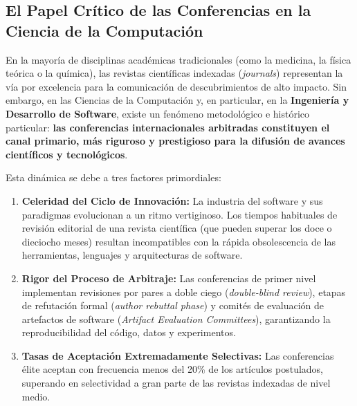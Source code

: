 \documentclass[12pt,a4paper]{article}
\begin{document}
\subsection{El Papel Crítico de las Conferencias en la Ciencia de la Computación}
En la mayoría de disciplinas académicas tradicionales (como la medicina, la física teórica o la química), las revistas científicas indexadas (\textit{journals}) representan la vía por excelencia para la comunicación de descubrimientos de alto impacto. Sin embargo, en las Ciencias de la Computación y, en particular, en la \textbf{Ingeniería y Desarrollo de Software}, existe un fenómeno metodológico e histórico particular: \textbf{las conferencias internacionales arbitradas constituyen el canal primario, más riguroso y prestigioso para la difusión de avances científicos y tecnológicos}.

Esta dinámica se debe a tres factores primordiales:
\begin{enumerate}[leftmargin=*]
    \item \textbf{Celeridad del Ciclo de Innovación:} La industria del software y sus paradigmas evolucionan a un ritmo vertiginoso. Los tiempos habituales de revisión editorial de una revista científica (que pueden superar los doce o dieciocho meses) resultan incompatibles con la rápida obsolescencia de las herramientas, lenguajes y arquitecturas de software.
    \item \textbf{Rigor del Proceso de Arbitraje:} Las conferencias de primer nivel implementan revisiones por pares a doble ciego (\textit{double-blind review}), etapas de refutación formal (\textit{author rebuttal phase}) y comités de evaluación de artefactos de software (\textit{Artifact Evaluation Committees}), garantizando la reproducibilidad del código, datos y experimentos.
    \item \textbf{Tasas de Aceptación Extremadamente Selectivas:} Las conferencias élite aceptan con frecuencia menos del 20\% de los artículos postulados, superando en selectividad a gran parte de las revistas indexadas de nivel medio.
\end{enumerate}
\end{document}
